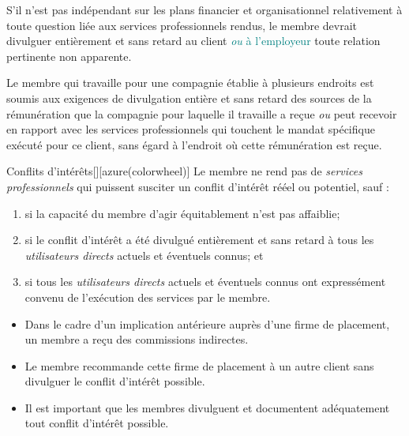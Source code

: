 \documentclass[10pt, french]{article}
\begin{document}
\begin{multicols*}{2}
\begin{definitionNOHFILLsub}[Annotation 4-2]
S’il n’est pas indépendant sur les plans financier et organisationnel relativement à toute question liée aux services professionnels rendus, le membre devrait divulguer entièrement et sans retard au client \textcolor{teal}{\textit{ou} à l'employeur} toute relation pertinente non apparente.
\end{definitionNOHFILLsub}

\begin{definitionNOHFILLsub}[Annotation 4-3]
Le membre qui travaille pour une compagnie établie à plusieurs endroits est soumis aux exigences de divulgation entière et sans retard des sources de la rémunération que la compagnie pour laquelle il travaille a reçue \textit{ou} peut recevoir en rapport avec les services professionnels qui touchent le mandat spécifique exécuté pour ce client, sans égard à l’endroit où cette rémunération est reçue.
\end{definitionNOHFILLsub}

\bigskip


\begin{definitionGENERAL}{Conflits d'intérêts}[][azure(colorwheel)]
Le membre ne rend pas de \og \textit{services professionnels} \fg{} qui puissent susciter un conflit d'intérêt rééel ou potentiel, sauf :
\begin{enumerate}[label = (\alph*)]
	\item	si la capacité du membre d'agir équitablement n'est pas affaiblie;
	\item	si le conflit d'intérêt a été divulgué entièrement et sans retard à tous les \og \textit{utilisateurs directs} \fg{}  actuels et éventuels connus; et
	\item	si tous les \og \textit{utilisateurs directs} \fg{} actuels et éventuels connus ont expressément convenu de l'exécution des services par le membre.
\end{enumerate}

\bigskip

\begin{rappel_enhanced}
\begin{itemize}
	\item	Dans le cadre d'un implication antérieure auprès d'une firme de placement, un membre a reçu des commissions indirectes. 
	\item	Le membre recommande cette firme de placement à un autre client sans divulguer le conflit d’intérêt possible. 
	\item	Il est important que les membres divulguent et documentent adéquatement tout conflit d’intérêt possible.
\end{itemize}
\end{rappel_enhanced}
\end{definitionGENERAL}


\end{multicols*}
\end{document}
